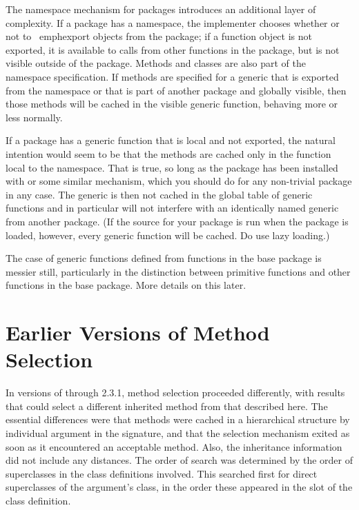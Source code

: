 \documentclass[11pt]{article}
\begin{document}
The namespace mechanism for packages introduces an additional layer of complexity.
If a package has a namespace, the implementer chooses whether or not to \ emph{export} objects from the package; if a function object is not exported, it is available to calls from other functions in the package, but is not visible outside of the package.
Methods and classes are also part of the namespace specification.
If methods are specified for a generic that is exported from the namespace or that is part of another package and globally visible, then those methods will be cached in the visible generic function, behaving more or less normally.

If a package has a generic function that is local and not exported, the natural intention would seem to be that the methods are cached only in the function local to the namespace.
That is true, so long as the package has been installed with  or some similar mechanism, which you should do for any non-trivial package in any case.
The generic is then not cached in the global table of generic functions and in particular will not interfere with an identically named generic from another package.
(If the source for  your package is run when the package is loaded, however, every generic function will be cached.  Do use lazy loading.)

The case of generic functions defined from functions in the base package is messier still, particularly in the distinction between primitive functions and other functions in the base package.
More details on this later.

\section{Earlier Versions of Method Selection}
\label{sec:earl-meth-select}

In versions of \R{} through 2.3.1, method selection proceeded differently, with results that could select a different inherited method from that described here.
The essential differences were that methods were cached in a hierarchical structure by individual argument in the signature, and that the selection mechanism exited as soon as it encountered an acceptable method.
Also, the inheritance information did not include any distances.
The order of search was determined by the order of superclasses in the class definitions involved.
This searched first for direct superclasses of the argument's class, in the order these appeared in the   slot of the class definition.
\end{document}
